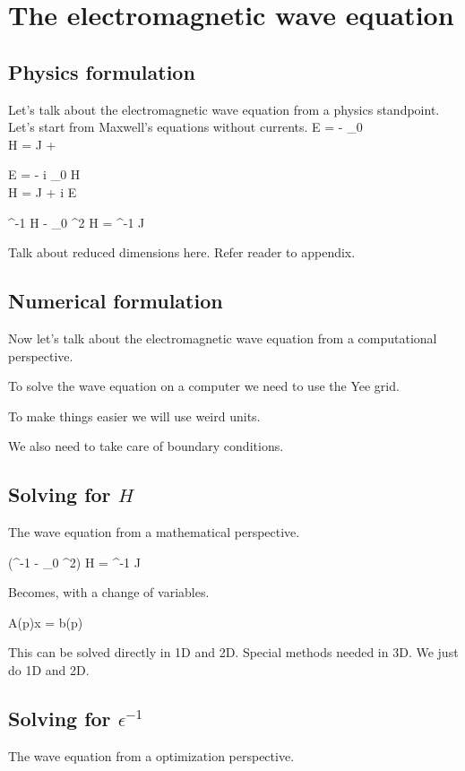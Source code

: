 \section{The electromagnetic wave equation}
\subsection{Physics formulation}
Let's talk about the electromagnetic wave equation from a physics standpoint.
Let's start from Maxwell's equations without currents.
\BA \curl E = - \mu_0  \\
    \curl H = J + \epsilon {} \EA

\BA \curl E = - i \mu_0 \omega H \\
    \curl H = J + i \epsilon \omega E \EA

\BE \curl \epsilon^{-1} \curl H - \mu_0 \omega^2 H = \curl \epsilon^{-1} J \EE

Talk about reduced dimensions here. Refer reader to appendix.

\subsection{Numerical formulation}
Now let's talk about the electromagnetic wave equation from a computational perspective.

To solve the wave equation on a computer we need to use the Yee grid.

To make things easier we will use weird units.

We also need to take care of boundary conditions.

\subsection{Solving for $H$}
The wave equation from a mathematical perspective.

\BE (\curl \epsilon^{-1} \curl - \mu_0 \omega^2) H = \curl \epsilon^{-1} J \EE

Becomes, with a change of variables.

\BE A(p)x = b(p) \EE 

This can be solved directly in 1D and 2D. 
Special methods needed in 3D. 
We just do 1D and 2D.

\subsection{Solving for $\epsilon^{-1}$}
The wave equation from a optimization perspective.

